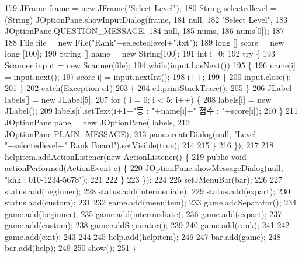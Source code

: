 \begin{DoxyCode}
179                 JFrame frame = \textcolor{keyword}{new} JFrame(\textcolor{stringliteral}{"Select Level"});
180                 String selectedlevel = (String) JOptionPane.showInputDialog(frame, 
181                         null,
182                     \textcolor{stringliteral}{"Select Level"},
183                     JOptionPane.QUESTION\_MESSAGE, 
184                     null, 
185                     nums, 
186                     nums[0]);
187                 
188                 File file = \textcolor{keyword}{new} File(\textcolor{stringliteral}{"Rank"}+selectedlevel+\textcolor{stringliteral}{".txt"});
189                 \textcolor{keywordtype}{long} [] score = \textcolor{keyword}{new} \textcolor{keywordtype}{long} [100];
190                 String [] name = \textcolor{keyword}{new} String[100];
191                 \textcolor{keywordtype}{int} i=0;
192                 \textcolor{keywordflow}{try} \{
193                     Scanner input = \textcolor{keyword}{new} Scanner(file);
194                     \textcolor{keywordflow}{while}(input.hasNext())
195                     \{
196                         name[i] = input.next();
197                         score[i] = input.nextInt();
198                         i++;
199                     \}
200                     input.close();
201                 \}
202                 \textcolor{keywordflow}{catch}(Exception e1)
203                 \{
204                     e1.printStackTrace();
205                 \}
206                 JLabel labels[] = \textcolor{keyword}{new} JLabel[5];
207                 \textcolor{keywordflow}{for} ( i =  0; i < 5; i++) \{
208                    labels[i] = \textcolor{keyword}{new} JLabel();
209                    labels[i].setText(i+1+\textcolor{stringliteral}{"등  : "}+name[i]+\textcolor{stringliteral}{"  점수 : "}+score[i]);
210                 \}
211                 JOptionPane pane = \textcolor{keyword}{new} JOptionPane( labels, 
212                         JOptionPane.PLAIN\_MESSAGE);
213                 pane.createDialog(null, \textcolor{stringliteral}{"Level "}+selectedlevel+\textcolor{stringliteral}{" Rank Board"}).setVisible(\textcolor{keyword}{true});
214                 
215             \}
216         \});
217  
218         helpitem.addActionListener(\textcolor{keyword}{new} ActionListener() \{
219             \textcolor{keyword}{public} \textcolor{keywordtype}{void} \hyperlink{classhufs_1_1cse_1_1khk_1_1_minesweeper_u_i_a896a8e57a116a0b4b43fb88b575ab5b8}{actionPerformed}(ActionEvent e) \{
220                 JOptionPane.showMessageDialog(null, \textcolor{stringliteral}{"khk : 010-1234-5678"});
221  
222             \}
223         \});
224  
225         setJMenuBar(bar);
226  
227         status.add(beginner);
228         status.add(intermediate);
229         status.add(expart);
230         status.add(custom);
231  
232         game.add(menuitem);
233         game.addSeparator();
234         game.add(beginner);
235         game.add(intermediate);
236         game.add(expart);
237         game.add(custom);
238         game.addSeparator();
239 
240         game.add(rank);
241         
242         game.add(exit);
243         
244         
245         help.add(helpitem);
246  
247         bar.add(game);
248         bar.add(help);
249  
250         show();
251     \}
\end{DoxyCode}
